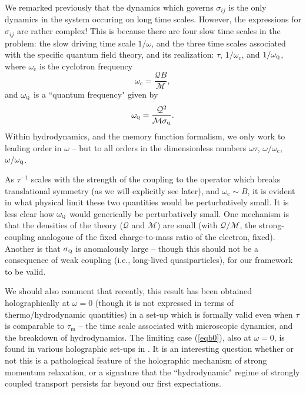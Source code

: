 \documentclass[10pt, oneside]{book}
\begin{document}
\begin{doublespace}
We remarked previously that the dynamics which governs $\sigma_{ij}$ is the only dynamics in the system occuring on long time scales.   However, the expressions for $\sigma_{ij}$ are rather complex!   This is because there are four slow time scales in the problem: the slow driving time scale $1/\omega$, and the three time scales associated with the specific quantum field theory, and its realization: $\tau$, $1/\omega_{\mathrm{c}}$, and $1/\omega_{\textsc{q}}$, where $\omega_{\mathrm{c}}$ is the cyclotron frequency \begin{equation}
\omega_{\mathrm{c}} = \frac{\mathcal{Q}B}{\mathcal{M}},
\end{equation}and $\omega_{\textsc{q}}$ is a ``quantum frequency" given by \begin{equation}
\omega_{\textsc{q}} = \frac{\mathcal{Q}^2}{\mathcal{M}\sigma_{\textsc{q}}}.
\end{equation}
Within hydrodynamics, and the memory function formalism, we  only work to leading order in $\omega$ -- but to all orders in the dimensionless numbers $\omega\tau$, $\omega/\omega_{\mathrm{c}}$, $\omega/\omega_{\textsc{q}}$.

As $\tau^{-1}$ scales with the strength of the coupling to the operator which breaks translational symmetry (as we will explicitly see later), and $\omega_{\mathrm{c}}\sim B$, it is evident in what physical limit these two quantities would be perturbatively small.    It is less clear how $\omega_{\textsc{q}}$ would generically be perturbatively small.    One mechanism is that the densities of the theory ($\mathcal{Q}$ and $\mathcal{M}$) are small (with $\mathcal{Q}/\mathcal{M}$, the strong-coupling analogoue of the fixed charge-to-mass ratio of the electron, fixed).    Another is that $\sigma_{\textsc{q}}$ is anomalously large -- though this should not be a consequence of weak coupling (i.e., long-lived quasiparticles), for our framework to be valid.

 We should also comment that recently, this result has been obtained holographically at $\omega=0$ \cite{Blake:2014yla} (though it is not expressed in terms of thermo/hydrodynamic quantities) in a set-up which is formally valid even when $\tau$ is comparable to $\tau_{\mathrm{m}}$ -- the time scale associated with microscopic dynamics, and the breakdown of hydrodynamics.  The limiting case (\ref{eqb0}), also at $\omega=0$, is found in various holographic set-ups in \cite{Blake:2013bqa, Gouteraux:2014hca, Lucas:2014sba}.   It is an interesting question whether or not this is a pathological feature of the holographic mechanism of strong momentum relaxation, or a signature that the ``hydrodynamic" regime of strongly coupled transport persists far beyond our first expectations.


\end{doublespace}
\end{document}
